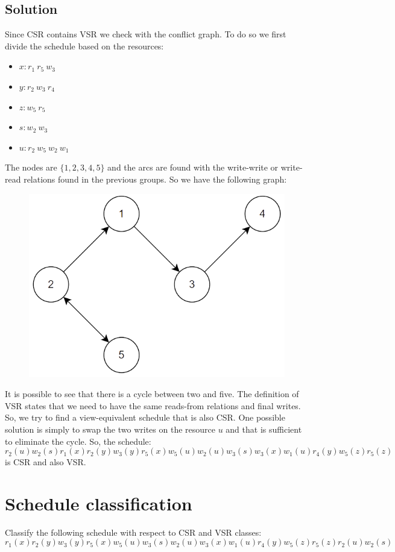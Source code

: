 \documentclass[12pt, a4paper]{report}
\newtheorem[style=M,bodystyle=\normalfont]{theorem}{Theorem}
\newtheorem[style=M,bodystyle=\normalfont]{corollary}{Corollary}
\newtheorem[style=M,bodystyle=\normalfont]{lemma}{Lemma}
\newtheorem[style=M,bodystyle=\normalfont]{definition}{Definition}
\begin{document}
    \subsection*{Solution}
        Since CSR contains VSR we check with the conflict graph. To do so we first divide the schedule based on the resources: 
        \begin{itemize}
            \item $x: r_1 \: r_5 \:w_3$
            \item $y: r_2 \: w_3 \:r_4$
            \item $z: w_5 \: r_5$
            \item $s: w_2 \: w_3$
            \item $u: r_2 \: w_5 \: w_2 \:w_1$
        \end{itemize}
        The nodes are $\{1,2,3,4,5\}$ and the arcs are found with the write-write or write-read relations found in the previous groups. So we have the following graph:
        \begin{figure}[H]
            \centering
            \includegraphics[width=0.5\linewidth]{images/conflictgraph1.png}
        \end{figure}
        It is possible to see that there is a cycle between two and five. The definition of VSR states that we need to have the same reads-from relations and final writes. So, we try to find a view-equivalent 
        schedule that is also CSR. One possible solution is simply to swap the two writes on the resource $u$ and that is sufficient to eliminate the cycle. So, the schedule: 
        \[r_2(u) w_2(s) r_1(x) r_2(y) w_3(y) r_5(x) w_5(u) w_2(u) w_3(s) w_3(x) w_1(u) r_4(y) w_5(z) r_5(z)\]
        is CSR and also VSR. 

    \newpage
    
    \section{Schedule classification}
        Classify the following schedule with respect to CSR and VSR classes:  
        \[r_1(x) r_2(y) w_3(y) r_5(x) w_5(u) w_3(s)w_2(u) w_3(x) w_1(u) r_4(y) w_5(z) r_5(z) r_2(u) w_2(s)\]
\end{document}
